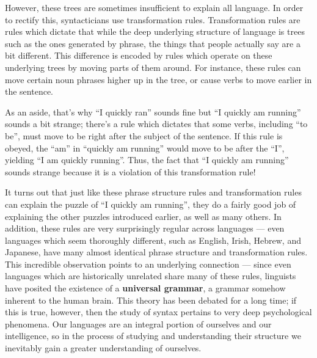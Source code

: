 \documentclass[twocolumn]{article}
\begin{document}
However, these trees are sometimes insufficient to explain all language. In order to rectify this,
syntacticians use transformation rules. Transformation rules are rules which dictate that while the
deep underlying structure of language is trees such as the ones generated by phrase, the things that
people actually say are a bit different. This difference is encoded by rules which operate on these
underlying trees by moving parts of them around. For instance, these rules can move certain noun
phrases higher up in the tree, or cause verbs to move earlier in the sentence. 

As an aside, that's why ``I quickly ran'' sounds fine but ``I quickly am running'' sounds a bit
strange; there's a rule which dictates that some verbs, including ``to be'', must move to be right
after the subject of the sentence. If this rule is obeyed, the ``am'' in ``quickly am running''
would move to be after the ``I'', yielding ``I am quickly running''. Thus, the fact that ``I quickly
am running'' sounds strange because it is a violation of this transformation rule!

It turns out that just like these phrase structure rules and transformation rules can explain the
puzzle of ``I quickly am running'', they do a fairly good job of explaining the other puzzles
introduced earlier, as well as many others. In addition, these rules are very surprisingly regular
across languages --- even languages which seem thoroughly different, such as English, Irish, Hebrew,
and Japanese, have many almost identical phrase structure and transformation rules. This incredible
observation points to an underlying connection --- since even languages which are historically
unrelated share many of these rules, linguists have posited the existence of a \textbf{universal
grammar}, a grammar somehow inherent to the human brain. This theory has been debated for a long
time; if this is true, however, then the study of syntax pertains to very deep psychological
phenomena.  Our languages are an integral portion of ourselves and our intelligence, so in the
process of studying and understanding their structure we inevitably gain a greater understanding of
ourselves.
\end{document}
